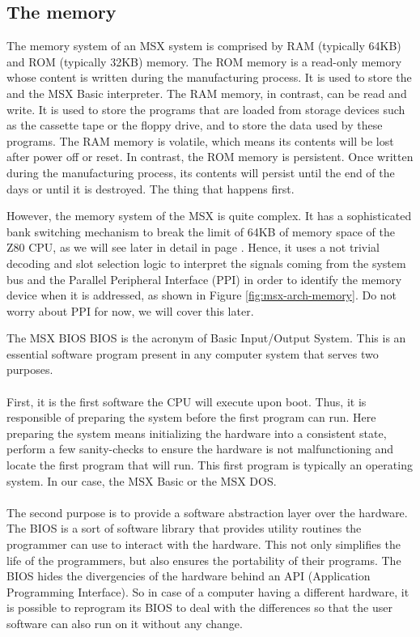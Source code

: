 \subsection{The memory}

The memory system of an MSX system is comprised by RAM (typically 64KB) and ROM (typically 32KB) memory. The ROM memory is a read-only memory whose content is written during the manufacturing process. It is used to store the  and the MSX Basic interpreter. The RAM memory, in contrast, can be read and write. It is used to store the programs that are loaded from storage devices such as the cassette tape or the floppy drive, and to store the data used by these programs. The RAM memory is volatile, which means its contents will be lost after power off or reset. In contrast, the ROM memory is persistent. Once written during the manufacturing process, its contents will persist until the end of the days or until it is destroyed. The thing that happens first.

However, the memory system of the MSX is quite complex. It has a sophisticated bank switching mechanism to break the limit of 64KB of memory space of the Z80 CPU, as we will see later in detail in page \pageref{sec:msx-mem-slots}. Hence, it uses a not trivial decoding and slot selection logic to interpret the signals coming from the system bus and the Parallel Peripheral Interface (PPI) in order to identify the memory device when it is addressed, as shown in Figure \ref{fig:msx-arch-memory}. Do not worry about PPI for now, we will cover this later. 

\begin{theory}{The MSX BIOS}
	BIOS is the acronym of Basic Input/Output System. This is an essential software program present in any computer system that serves two purposes.\\\\
	
	First, it is the first software the CPU will execute upon boot. Thus, it is responsible of preparing the system before the first program can run. Here preparing the system means initializing the hardware into a consistent state, perform a few sanity-checks to ensure the hardware is not malfunctioning and locate the first program that will run. This first program is typically an operating system. In our case, the MSX Basic or the MSX DOS.\\\\
	
	The second purpose is to provide a software abstraction layer over the hardware. The BIOS is a sort of software library that provides utility routines the programmer can use to interact with the hardware. This not only simplifies the life of the programmers, but also ensures the portability of their programs. The BIOS hides the divergencies of the hardware behind an API (Application Programming Interface). So in case of a computer having a different hardware, it is possible to reprogram its BIOS to deal with the differences so that the user software can also run on it without any change.
\end{theory}

